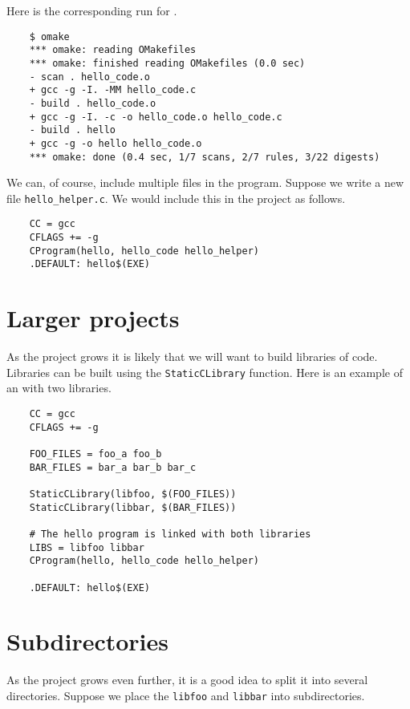 Here is the corresponding run for .

\begin{verbatim}
    $ omake
    *** omake: reading OMakefiles
    *** omake: finished reading OMakefiles (0.0 sec)
    - scan . hello_code.o
    + gcc -g -I. -MM hello_code.c
    - build . hello_code.o
    + gcc -g -I. -c -o hello_code.o hello_code.c
    - build . hello
    + gcc -g -o hello hello_code.o
    *** omake: done (0.4 sec, 1/7 scans, 2/7 rules, 3/22 digests)
\end{verbatim}

We can, of course, include multiple files in the program.  Suppose we write a new
file \verb+hello_helper.c+.  We would include this in the project as follows.

\begin{verbatim}
    CC = gcc
    CFLAGS += -g
    CProgram(hello, hello_code hello_helper)
    .DEFAULT: hello$(EXE)
\end{verbatim}

\section{Larger projects}

As the project grows it is likely that we will want to build libraries of code.
Libraries can be built using the \verb+StaticCLibrary+ function.  Here is an example
of an  with two libraries.

\begin{verbatim}
    CC = gcc
    CFLAGS += -g

    FOO_FILES = foo_a foo_b
    BAR_FILES = bar_a bar_b bar_c

    StaticCLibrary(libfoo, $(FOO_FILES))
    StaticCLibrary(libbar, $(BAR_FILES))

    # The hello program is linked with both libraries
    LIBS = libfoo libbar
    CProgram(hello, hello_code hello_helper)

    .DEFAULT: hello$(EXE)
\end{verbatim}

\section{Subdirectories}

As the project grows even further, it is a good idea to split it into several directories.
Suppose we place the \verb+libfoo+ and \verb+libbar+ into subdirectories.

